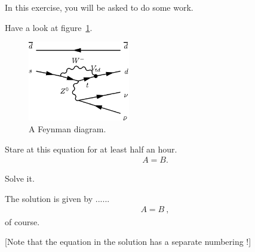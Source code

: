 \documentclass[11pt,a4paper]{article}
\begin{document}
\MakeUebungHeader


In this exercise, you will be asked to do some work.

Have a look at figure~\ref{fig:Penguin}.
\begin{figure}[h] %
  \centering
  \includegraphics[height=3.5cm]{fig/penguin}
  \caption{A Feynman diagram.}
  \label{fig:Penguin}
\end{figure}

\begin{exenumerate}
\item Stare at this equation for at least half an hour.
  \begin{align}
    A = B.
  \end{align}

\item Solve it.

  \begin{loesung}%
    The solution is given by ...... 
    \begin{align}
      A=B\ ,
    \end{align}
    of course.

    [Note that the equation in the solution has a separate numbering !]
  \end{loesung}
\end{exenumerate}
\end{document}
